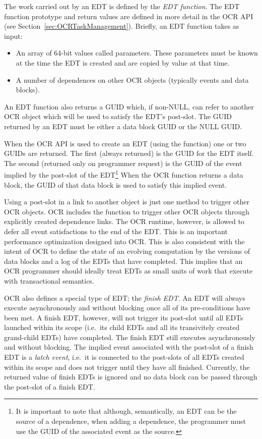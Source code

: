 The work carried out by an EDT is defined by
the \emph{EDT function}. The EDT function
prototype and return values are defined in more detail in the OCR API (see
Section~\ref{sec:OCRTaskManagement}). Briefly, an EDT function takes
as input:
\begin{itemize}
\item An array of 64-bit values called parameters. These parameters
  must be known at the time the EDT is created and are copied by value at
  that time.
\item A number of dependences on other OCR objects (typically events
  and data blocks).
\end{itemize}

An EDT function also returns a GUID which, if non-NULL, can refer to
another OCR object which will be used to satisfy the EDT's post-slot.
The GUID returned by an EDT must be either a data block GUID or the NULL GUID.

When the OCR API is used to create an EDT (using the  function)
one or two GUIDs are returned. The first (always returned) is the GUID
for the EDT itself. The second (returned only on programmer request)
is the GUID of the event implied by the post-slot of the EDT\footnote{It is important to
note that although, semantically, an EDT can be the source of a
dependence, when adding a dependence, the programmer must use the
GUID of the associated event as the source.}
When the OCR function returns a data block, the GUID of
that data block is used to satisfy this implied event.

Using a post-slot in a link to another object is just one method to
trigger other OCR objects. OCR includes the 
function to trigger other OCR objects through explicitly created dependence
links. The OCR runtime, however, is allowed to defer all event satisfactions
to the end of the EDT. This is an important performance optimization designed
into OCR. This is also consistent with the intent of OCR to define the state
of an evolving computation by the versions of data blocks and a log of the
EDTs that have completed. This implies that an OCR programmer should
ideally treat EDTs as small units of work that execute with transactional
semantics.

OCR also defines a special type of EDT; the \emph{finish
EDT}. An EDT will always execute asynchronously and
without blocking once all of its pre-conditions have been met. A
finish EDT, however, will not trigger its post-slot until all EDTs
launched within its scope (i.e.\ its child EDTs and all its transivitely
created grand-child EDTs) have completed. The finish EDT still executes
asynchronously and without blocking. The implied event associated with
the post-slot of a finish EDT is a \emph{latch event}, i.e.\ it is
connected to the post-slots of all EDTs created within its scope and
does not trigger until they have all finished. Currently, the returned
value of finish EDTs is ignored and no data block can be passed
through the post-slot of a finish EDT.

